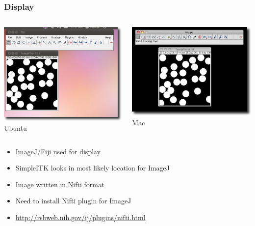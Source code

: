 \begin{frame}[fragile]
\frametitle{Display}
\begin{columns}[c]
\begin{center}
\includegraphics[width=1\textwidth]{Images/ImageDisplay_shadow} \\
Ubuntu
\end{center}
\begin{center}
\includegraphics[width=1\textwidth]{Images/ImageDisplayMac_shadow} \\
Mac
\end{center}
\end{columns}
\begin{itemize}
  \item ImageJ/Fiji used for display
  \item SimpleITK looks in most likely location for ImageJ
  \item Image written in Nifti format
  \item Need to install Nifti plugin for ImageJ
  \item \url{http://rsbweb.nih.gov/ij/plugins/nifti.html}
\end{itemize}
\end{frame}




